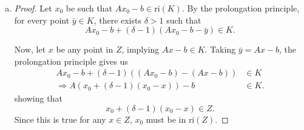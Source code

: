 \documentclass{article}
\begin{document}
\begin{solution}
\begin{enumerate}[(a)]
{\begin{proof}
            \end{proof}
        }
        \item {
            \begin{proof}
                Let \( x_0 \) be such that \( Ax_0 - b \in \text{ri}(K) \). By the prolongation principle, for every point \( \bar{y} \in K \), there exists \( \delta > 1 \) such that
                \[ Ax_0 - b + (\delta - 1)(Ax_0 - b - \bar{y}) \in K. \]

                Now, let \( x \) be any point in \( Z \), implying \( Ax - b \in K \).
                Taking \( \bar{y} = Ax - b \), the prolongation principle gives us
                \begin{align*}
                    Ax_0 - b + (\delta - 1)((Ax_0 - b) - (Ax - b)) &\in K \\
                    \Rightarrow A(x_0 + (\delta - 1)(x_0 - x))-b &\in K.
                \end{align*}
                showing that
                \[ x_0 + (\delta - 1)(x_0 - x) \in Z. \]
                Since this is true for any \( x \in Z \), \( x_0 \) must be in \( \text{ri}(Z) \).


\end{proof}}
\end{enumerate}
\end{solution}
\end{document}
